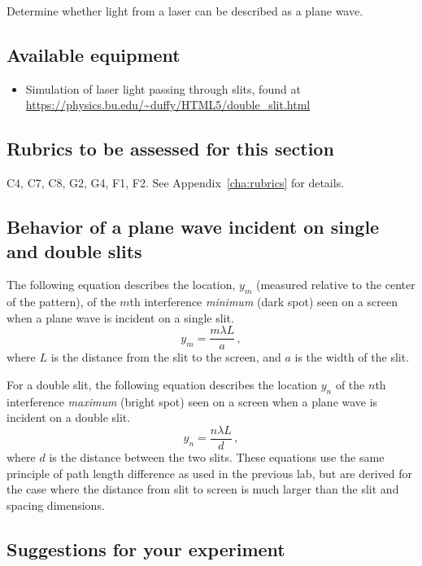 Determine whether light from a laser can be described as a plane wave.

\subsection{Available equipment}


\begin{itemize}
	\item Simulation of laser light passing through slits, found at \url{https://physics.bu.edu/~duffy/HTML5/double_slit.html}
\end{itemize}

\subsection{Rubrics to be assessed for this section}

C4, C7, C8, G2, G4, F1, F2. See Appendix~\ref{cha:rubrics} for details.

\subsection{Behavior of a plane wave incident on single and double slits}

The following equation describes the location, $y_m$ (measured relative to the center of the pattern), of the $m$th interference \textit{minimum} (dark spot) seen on a screen when a plane wave is incident on a single slit.
\begin{equation}
y_m = \frac{m \lambda L}{a} \,,
\end{equation}
where $L$ is the distance from the slit to the screen, and $a$ is the width of the slit.

For a double slit, the following equation describes the location $y_n$ of the $n$th interference \textit{maximum} (bright spot) seen on a screen when a plane wave is incident on a double slit.
\begin{equation}
y_n = \frac{n \lambda L}{d} \,,
\end{equation}
where $d$ is the distance between the two slits. These equations use the same principle of path length difference as used in the previous lab, but are derived for the case where the distance from slit to screen is much larger than the slit and spacing dimensions.

\subsection{Suggestions for your experiment}


